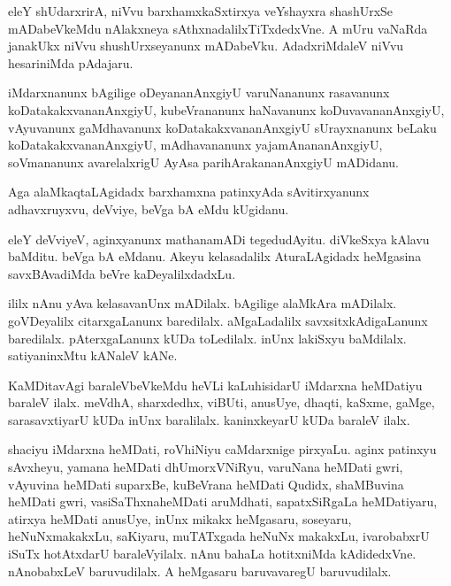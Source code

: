 \documentclass{article}
\begin{document}
\begin{mn}
eleY shUdarxrirA, niVvu barxhamxkaSxtirxya  veYshayxra shashUrxSe mADabeVkeMdu 
nAlakxneya sAthxnadalilxTiTxdedxVne.  A mUru vaNaRda janakUkx niVvu shushUrxseyanunx  
mADabeVku. AdadxriMdaleV niVvu hesariniMda pAdajaru.
\end{mn}

\begin{mn}
iMdarxnanunx bAgilige oDeyananAnxgiyU  varuNananunx rasavanunx koDatakakxvananAnxgiyU,  
kubeVrananunx haNavanunx koDuvavananAnxgiyU, vAyuvanunx gaMdhavanunx koDatakakxvananAnxgiyU  
sUrayxnanunx beLaku koDatakakxvananAnxgiyU, mAdhavananunx yajamAnananAnxgiyU, soVmananunx 
avarelalxrigU AyAsa parihArakananAnxgiyU  mADidanu.
\end{mn}

\begin{mn}
Aga alaMkaqtaLAgidadx  barxhamxna patinxyAda sAvitirxyanunx adhavxruyxvu, deVviye, beVga bA eMdu kUgidanu.
\end{mn}

\begin{mn}
eleY deVviyeV, aginxyanunx  mathanamADi tegedudAyitu. diVkeSxya kAlavu baMditu.   
beVga bA eMdanu.  Akeyu kelasadalilx AturaLAgidadx  heMgasina  savxBAvadiMda beVre kaDeyalilxdadxLu.
\end{mn}

\begin{mn}
ililx nAnu yAva kelasavanUnx mADilalx. bAgilige alaMkAra mADilalx.  goVDeyalilx citarxgaLanunx 
baredilalx.  aMgaLadalilx savxsitxkAdigaLanunx  baredilalx. pAterxgaLanunx kUDa toLedilalx.  
inUnx lakiSxyu baMdilalx. satiyaninxMtu  kANaleV kANe.
\end{mn}

\begin{mn}
KaMDitavAgi baraleVbeVkeMdu heVLi kaLuhisidarU iMdarxna heMDatiyu baraleV ilalx.  
meVdhA, sharxdedhx, viBUti, anusUye, dhaqti, kaSxme, gaMge, sarasavxtiyarU kUDa 
inUnx baralilalx.  kaninxkeyarU kUDa baraleV ilalx.
\end{mn}

\begin{mn}
shaciyu  iMdarxna  heMDati,  roVhiNiyu  caMdarxnige pirxyaLu.  aginx patinxyu  
sAvxheyu,  yamana heMDati  dhUmorxVNiRyu,  varuNana heMDati gwri, vAyuvina heMDati 
suparxBe,  kuBeVrana heMDati Qudidx, shaMBuvina heMDati gwri, vasiSaThxnaheMDati 
aruMdhati, sapatxSiRgaLa heMDatiyaru, atirxya heMDati anusUye, inUnx mikakx heMgasaru, 
soseyaru,  heNuNxmakakxLu,  saKiyaru,  muTATxgada heNuNx makakxLu,  ivarobabxrU iSuTx 
hotAtxdarU   baraleVyilalx. nAnu bahaLa hotitxniMda kAdidedxVne. nAnobabxLeV 
baruvudilalx.  A heMgasaru baruvavaregU baruvudilalx.
\end{mn}
\end{document}
